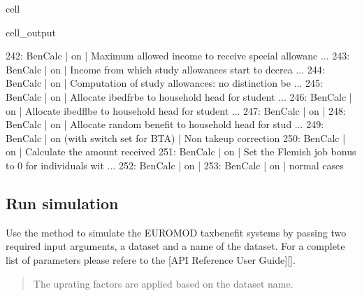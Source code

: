 \documentclass[letterpaper,10pt,english]{sphinxmanual}
\begin{document}
\begin{sphinxuseclass}{cell}
\begin{sphinxuseclass}{cell_output}
\begin{sphinxVerbatim}[commandchars=\\\{\}]
242: BenCalc     | on                                                       |    Maximum allowed income to receive special allowanc ... 
243: BenCalc     | on                                                       |    Income from which study allowances start to decrea ... 
244: BenCalc     | on                                                       |    Computation of study allowances: no distinction be ... 
245: BenCalc     | on                                                       |    Allocate i\PYGZus{}bed\PYGZus{}fr\PYGZus{}be to household head for student ... 
246: BenCalc     | on                                                       |    Allocate i\PYGZus{}bed\PYGZus{}fl\PYGZus{}be to household head for student ... 
247: BenCalc     | on                                                       |     
248: BenCalc     | on                                                       |    Allocate random benefit to household head for stud ... 
249: BenCalc     | on (with switch set for BTA)                             |    Non take\PYGZhy{}up correction 
250: BenCalc     | on                                                       |    Calculate the amount received 
251: BenCalc     | on                                                       |    Set the Flemish job bonus to 0 for individuals wit ... 
252: BenCalc     | on                                                       |     
253: BenCalc     | on                                                       |    normal cases 
\end{sphinxVerbatim}

\end{sphinxuseclass}
\end{sphinxuseclass}

\subsection{Run simulation}
\label{\detokenize{userguide:run-simulation}}
\sphinxAtStartPar
Use the  method to simulate the EUROMOD tax\sphinxhyphen{}benefit systems by passing two required input arguments, a  dataset and a name of the dataset. For a complete list of parameters please refere to the {[}API Reference User Guide{]}{[}{]}.
\begin{quote}

\sphinxAtStartPar
{} The uprating factors are applied based on the dataset name.
\end{quote}
\end{document}
